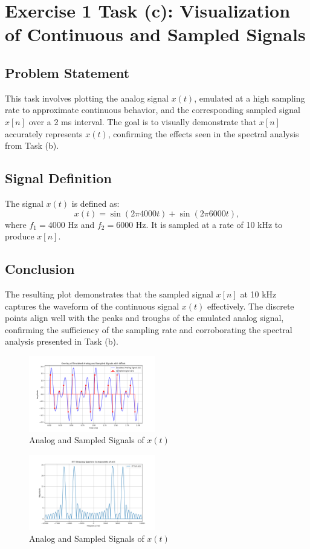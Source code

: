 
\item[(c)]
\section{Exercise 1 Task (c): Visualization of Continuous and Sampled Signals}

\subsection{Problem Statement}
This task involves plotting the analog signal $x(t)$, emulated at a high sampling rate to approximate continuous behavior, and the corresponding sampled signal $x[n]$ over a 2 ms interval. The goal is to visually demonstrate that $x[n]$ accurately represents $x(t)$, confirming the effects seen in the spectral analysis from Task (b).

\subsection{Signal Definition}
The signal $x(t)$ is defined as:
$$
x(t) = \sin(2\pi 4000 t) + \sin(2\pi 6000 t),
$$
where $f_1 = 4000 \text{ Hz}$ and $f_2 = 6000 \text{ Hz}$. It is sampled at a rate of 10 kHz to produce $x[n]$.

\subsection{Conclusion}
The resulting plot demonstrates that the sampled signal $x[n]$ at 10 kHz captures the waveform of the continuous signal $x(t)$ effectively. The discrete points align well with the peaks and troughs of the emulated analog signal, confirming the sufficiency of the sampling rate and corroborating the spectral analysis presented in Task (b).

\begin{figure}[h]
    \centering
    \includegraphics[width=0.49\textwidth]{fig/ex1_c_plot_1}
    \caption{Analog and Sampled Signals of \(x(t)\)}
    \label{fig:ex1_c_plot_1}
\end{figure}

\begin{figure}[h]
    \centering
    \includegraphics[width=0.49\textwidth]{fig/ex1_c_plot_2}
    \caption{Analog and Sampled Signals of \(x(t)\)}
    \label{fig:ex1_c_plot_2}
\end{figure}
